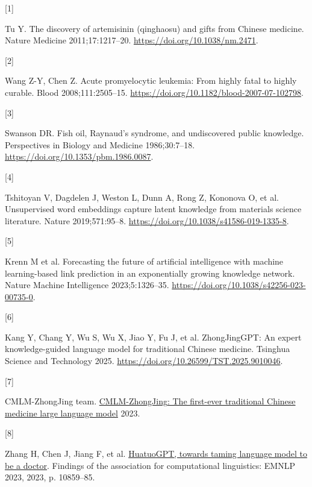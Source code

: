 \documentclass[
]{article}
\newlength{\cslhangindent}
\newlength{\csllabelwidth}
\newlength{\cslentryspacingunit} %
\newenvironment{CSLReferences}[2] %
 {%
  \setlength{\parindent}{0pt}
  \ifodd #1
  \let\oldpar\par
  \def\par{\hangindent=\cslhangindent\oldpar}
  \fi
  \setlength{\parskip}{#2\cslentryspacingunit}
 }%
 {}
\newcommand{\CSLLeftMargin}[1]{\parbox[t]{\csllabelwidth}{#1}}
\newcommand{\CSLRightInline}[1]{\parbox[t]{\linewidth - \csllabelwidth}{#1}\break}
\begin{document}
\hypertarget{refs}{}
\begin{CSLReferences}{0}{0}
\leavevmode{}%
\CSLLeftMargin{{[}1{]} }%
\CSLRightInline{Tu Y. The discovery of artemisinin (qinghaosu) and gifts
from {Chinese} medicine. Nature Medicine 2011;17:1217--20.
\url{https://doi.org/10.1038/nm.2471}.}

\leavevmode{}%
\CSLLeftMargin{{[}2{]} }%
\CSLRightInline{Wang Z-Y, Chen Z. Acute promyelocytic leukemia: From
highly fatal to highly curable. Blood 2008;111:2505--15.
\url{https://doi.org/10.1182/blood-2007-07-102798}.}

\leavevmode{}%
\CSLLeftMargin{{[}3{]} }%
\CSLRightInline{Swanson DR. Fish oil, {Raynaud's} syndrome, and
undiscovered public knowledge. Perspectives in Biology and Medicine
1986;30:7--18. \url{https://doi.org/10.1353/pbm.1986.0087}.}

\leavevmode{}%
\CSLLeftMargin{{[}4{]} }%
\CSLRightInline{Tshitoyan V, Dagdelen J, Weston L, Dunn A, Rong Z,
Kononova O, et al. Unsupervised word embeddings capture latent knowledge
from materials science literature. Nature 2019;571:95--8.
\url{https://doi.org/10.1038/s41586-019-1335-8}.}

\leavevmode{}%
\CSLLeftMargin{{[}5{]} }%
\CSLRightInline{Krenn M et al. Forecasting the future of artificial
intelligence with machine learning-based link prediction in an
exponentially growing knowledge network. Nature Machine Intelligence
2023;5:1326--35. \url{https://doi.org/10.1038/s42256-023-00735-0}.}

\leavevmode{}%
\CSLLeftMargin{{[}6{]} }%
\CSLRightInline{Kang Y, Chang Y, Wu S, Wu X, Jiao Y, Fu J, et al.
{ZhongJingGPT}: An expert knowledge-guided language model for
traditional {Chinese} medicine. Tsinghua Science and Technology 2025.
\url{https://doi.org/10.26599/TST.2025.9010046}.}

\leavevmode{}%
\CSLLeftMargin{{[}7{]} }%
\CSLRightInline{CMLM-ZhongJing team.
\href{https://github.com/pariskang/CMLM-ZhongJing}{{CMLM-ZhongJing}: The
first-ever traditional {Chinese} medicine large language model} 2023.}

\leavevmode{}%
\CSLLeftMargin{{[}8{]} }%
\CSLRightInline{Zhang H, Chen J, Jiang F, et al.
\href{https://aclanthology.org/2023.findings-emnlp.725}{{HuatuoGPT},
towards taming language model to be a doctor}. Findings of the
association for computational linguistics: EMNLP 2023, 2023, p.
10859--85.}


\end{CSLReferences}
\end{document}
